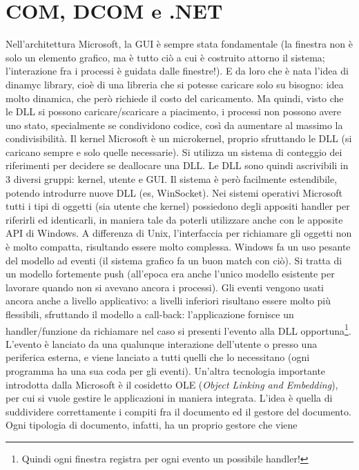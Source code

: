 \section{COM, DCOM e .NET}
Nell'architettura Microsoft, la GUI è sempre stata fondamentale (la finestra non è solo un elemento grafico, ma è tutto
ciò a cui è costruito attorno il sistema; l'interazione fra i processi è guidata dalle finestre!). E da loro che è nata
l'idea di dinamyc library, cioè di una libreria che si potesse caricare solo su bisogno: idea molto dinamica, che però
richiede il costo del caricamento.
Ma quindi, visto che le DLL si possono caricare/scaricare a piacimento, i processi non possono avere uno stato,
specialmente se condividono codice, così  da aumentare al massimo la condivisibilità. Il kernel Microsoft è un
microkernel, proprio sfruttando le DLL (si caricano sempre e solo quelle necessarie).
Si utilizza un sistema di conteggio dei riferimenti per decidere se deallocare una DLL.
Le DLL sono quindi ascrivibili in 3 diversi gruppi: kernel, utente e GUI. Il sistema è però facilmente
estendibile, potendo introdurre nuove DLL (es, WinSocket).
Nei sistemi operativi Microsoft tutti i tipi di oggetti (sia utente che kernel) possiedono degli appositi handler per
riferirli ed identicarli, in maniera tale da poterli utilizzare anche con le apposite API di Windows. A differenza di
Unix, l'interfaccia per richiamare gli oggetti non è molto compatta, risultando essere molto complessa.
Windows fa un uso pesante del modello ad eventi (il sistema grafico fa un buon match con ciò). Si tratta di un modello
fortemente push (all'epoca era anche l'unico modello esistente per lavorare quando non si avevano ancora i processi).
Gli eventi vengono usati ancora anche a livello applicativo: a livelli inferiori risultano essere molto più flessibili,
sfruttando il modello a call-back: l'applicazione fornisce un handler/funzione da richiamare nel caso si presenti
l'evento alla DLL opportuna\footnote{Quindi ogni finestra registra per ogni evento un possibile handler!}. L'evento è
lanciato da una qualunque interazione dell'utente o presso una periferica esterna, e viene lanciato a tutti quelli che
lo necessitano (ogni programma ha una sua coda per gli eventi).
Un'altra tecnologia importante introdotta dalla Microsoft è il cosidetto OLE (\textit{Object Linking and Embedding}),
per cui si vuole gestire le applicazioni in maniera integrata. L'idea è quella di suddividere correttamente i compiti
fra il documento ed il gestore del documento. Ogni tipologia di documento, infatti, ha un proprio gestore che viene

